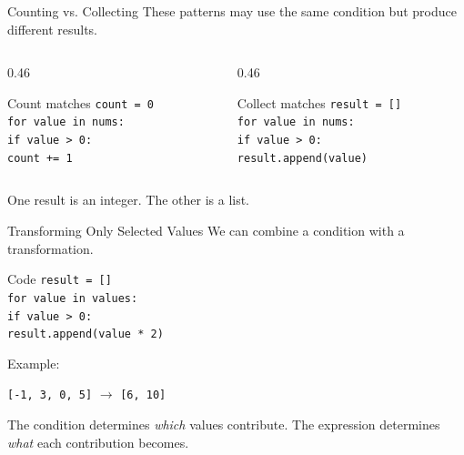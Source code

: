 \documentclass[aspectratio=169,10pt]{beamer}
\begin{document}
\begin{frame}{Counting vs. Collecting}
  These patterns may use the same condition but produce different results.

  \begin{columns}[T,onlytextwidth]
    \begin{column}{0.46\textwidth}
      \begin{block}{Count matches}
        \texttt{count = 0}\\
        \texttt{for value in nums:}\\
        \hspace{0.18in}\texttt{if value > 0:}\\
        \hspace{0.36in}\texttt{count += 1}
      \end{block}
    \end{column}
    \begin{column}{0.46\textwidth}
      \begin{block}{Collect matches}
        \texttt{result = []}\\
        \texttt{for value in nums:}\\
        \hspace{0.18in}\texttt{if value > 0:}\\
        \hspace{0.36in}\texttt{result.append(value)}
      \end{block}
    \end{column}
  \end{columns}

  One result is an integer. The other is a list.
\end{frame}

\begin{frame}{Transforming Only Selected Values}
  We can combine a condition with a transformation.

  \begin{block}{Code}
    \texttt{result = []}\\
    \texttt{for value in values:}\\
    \hspace{0.20in}\texttt{if value > 0:}\\
    \hspace{0.40in}\texttt{result.append(value * 2)}
  \end{block}

  Example:
  \begin{center}
    \texttt{[-1, 3, 0, 5]} $\rightarrow$ \texttt{[6, 10]}
  \end{center}

  \begin{keyidea}
    The condition determines \emph{which} values contribute. The expression determines \emph{what} each contribution becomes.
  \end{keyidea}
\end{frame}
\end{document}
